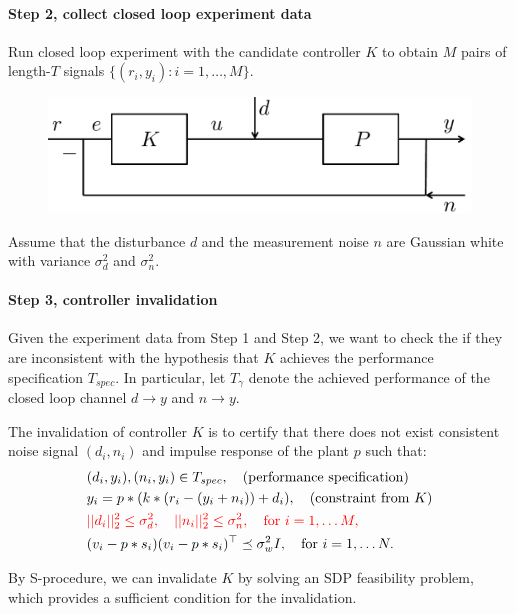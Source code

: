 \documentclass[11pt, onecolumn]{article}
\newcommand{\rb}[1]{{\color{red}{ #1}}}
\begin{document}
\paragraph{Step 2,  collect closed  loop experiment data}
Run closed loop experiment with the candidate controller $K$ to obtain $M$ pairs of length-$T$ signals
$\{(r_i,y_i) : i=1,\dots, M\}$.
\begin{figure}[!ht]
  \centering
  \includegraphics[width=.5\linewidth]{sys2.pdf}
\end{figure}

\begin{assumption}
  Assume that the disturbance $d$ and the measurement noise $n$ are Gaussian white with variance
  $\sigma_d^2$ and $\sigma_n^2$.
\end{assumption}


\paragraph{Step 3, controller invalidation}
Given the experiment data from Step 1 and Step 2, we want to check the if they are inconsistent with
the hypothesis that $K$ achieves the performance specification $T_{spec}$.
%
In particular, let $T_{\gamma}$ denote the achieved performance of the closed loop channel $d\to y$
and $n\to y$.

The invalidation of controller $K$ is to certify that there does not exist consistent noise signal
$(d_i, n_i)$ and impulse response of the plant $p$ such that:
\begin{align*}
  & (d_i,y_i), (n_i,y_i)\in T_{spec}, \quad\tx{(performance specification)}
  \\
  & y_i = p * ( k* (r_i-(y_i+n_i)) +d_i), \quad\tx{(constraint from $K$)}
  \\
  & \rb{||d_i||_2^2\leq \sigma_d^2 , \quad ||n_i||_2^2\leq \sigma_n^2, \quad \tx{for }i=
  1,\dots M,}
  \\
  & ( v_i - p*s_i) (v_i - p*s_i)^\top \preceq \sigma_w^2 I, \quad \tx{for }i= 1,\dots N.
\end{align*}

By S-procedure, we can invalidate $K$ by solving an SDP feasibility problem, which provides
a sufficient condition for the invalidation.
\end{document}
